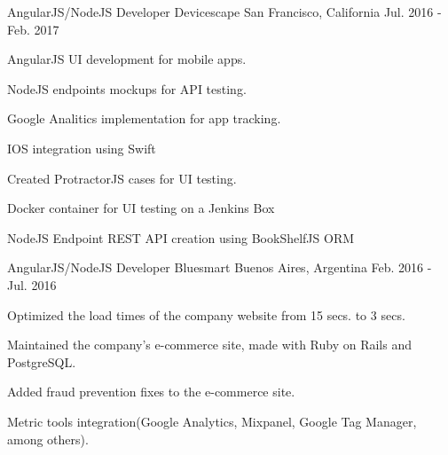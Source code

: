\begin{cventries}
    \cventry
    {AngularJS/NodeJS Developer} %
    {Devicescape} %
    {San Francisco, California} %
    {Jul. 2016 - Feb. 2017} %
    {
    \begin{cvitems} %
        \item {AngularJS UI development for mobile apps.}
        \item {NodeJS endpoints mockups for API testing.}
        \item {Google Analitics implementation for app tracking.}
        \item {IOS integration using Swift}
        \item {Created ProtractorJS cases for UI testing.}
        \item {Docker container for UI testing on a Jenkins Box}
        \item {NodeJS Endpoint REST API creation using BookShelfJS ORM}
    \end{cvitems}
    }

    \cventry
    {AngularJS/NodeJS Developer} %
    {Bluesmart} %
    {Buenos Aires, Argentina} %
    {Feb. 2016 - Jul. 2016} %
    {
    \begin{cvitems} %
        \item {Optimized the load times of the company website from 15 secs. to 3 secs.}
        \item {Maintained the company's e-commerce site, made with Ruby on Rails and PostgreSQL.}
        \item {Added fraud prevention fixes to the e-commerce site.}
        \item {Metric tools integration(Google Analytics, Mixpanel, Google Tag Manager, among others).}
    \end{cvitems}
    }


\end{cventries}
